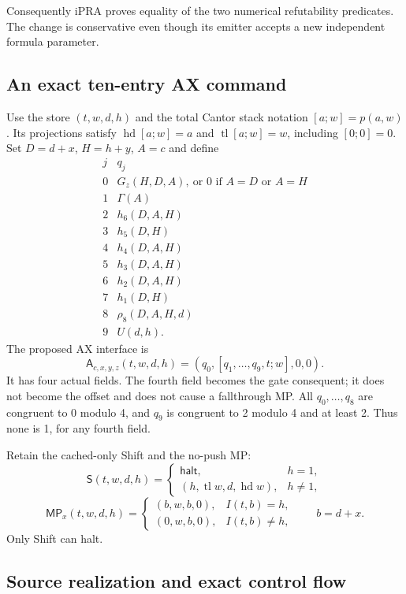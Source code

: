 Consequently iPRA proves equality of the two numerical refutability
predicates.  The change is conservative even though its emitter accepts a
new independent formula parameter.

\subsection{An exact ten-entry AX command}

Use the store $(t,w,d,h)$ and the total Cantor stack notation
$[a;w]=p(a,w)$.  Its projections satisfy
$\operatorname{hd}[a;w]=a$ and $\operatorname{tl}[a;w]=w$, including
$[0;0]=0$.  Set $D=d+x$, $H=h+y$, $A=c$ and define
\[
\begin{array}{c|l}
 j&q_j\\\hline
 0&G_z(H,D,A),\ \text{or }0\text{ if }A=D\text{ or }A=H\\
 1&\Gamma(A)\\
 2&h_6(D,A,H)\\
 3&h_5(D,H)\\
 4&h_4(D,A,H)\\
 5&h_3(D,A,H)\\
 6&h_2(D,A,H)\\
 7&h_1(D,H)\\
 8&\rho_8(D,A,H,d)\\
 9&U(d,h).
\end{array}
\]
The proposed AX interface is
\[
 \mathsf A_{c,x,y,z}(t,w,d,h)
       =(q_0,[q_1,\ldots,q_9,t;w],0,0).                 \tag{GX2}
\]
It has four actual fields.  The fourth field becomes the gate consequent;
it does not become the offset and does not cause a fallthrough MP.
All $q_0,\ldots,q_8$ are congruent to 0 modulo 4, and $q_9$ is congruent
to 2 modulo 4 and at least 2.  Thus none is 1, for any fourth field.

Retain the cached-only Shift and the no-push MP:
\[
 \mathsf S(t,w,d,h)=
 \begin{cases}\mathsf{halt},&h=1,\\
 (h,\operatorname{tl}w,d,\operatorname{hd}w),&h\ne1,
 \end{cases}                                           \tag{GX3}
\]
\[
 \mathsf{MP}_x(t,w,d,h)=
 \begin{cases}(b,w,b,0),&I(t,b)=h,\\
 (0,w,b,0),&I(t,b)\ne h,
 \end{cases}\qquad b=d+x.                              \tag{GX4}
\]
Only Shift can halt.

\subsection{Source realization and exact control flow}


